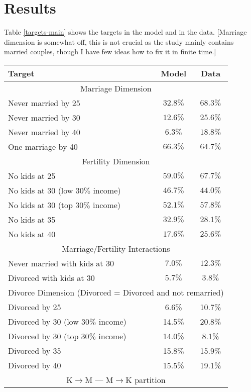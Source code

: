 \documentclass[12pt,letter]{article}
\begin{document}
\section{Results}
Table \ref{targets-main} shows the targets in the model and in the data. [Marriage dimension is somewhat off, this is not crucial as the study mainly contains married couples, though I have few ideas how to fix it in finite time.]
\begin{table}
\begin{center}
\begin{tabular}{|l|c|c|}\hline
Target & Model & Data \\\hline
\multicolumn{3}{|c|}{Marriage Dimension} \\\hline
Never married by 25  & $32.8\%$ & $68.3\%$  \\
Never married by 30 & $12.6\%$ & $25.6\%$  \\
Never married by 40 & $6.3\%$ & $18.8\%$  \\\hline
One marriage by 40 & $66.3\%$ & $64.7\%$ \\\hline
\multicolumn{3}{|c|}{Fertility Dimension} \\\hline
No kids at 25 & $59.0\%$ & $67.7\%$ \\
No kids at 30 (low $30\%$ income) & $46.7\%$  &   $44.0\%$ \\
No kids at 30 (top $30\%$ income) & $52.1\%$  &   $57.8\%$ \\
No kids at 35  & $32.9\%$  &   $28.1\%$ \\
No kids at 40 & $17.6\%$ & $25.6\%$ \\\hline
\multicolumn{3}{|c|}{Marriage/Fertility Interactions} \\\hline
Never married with kids at 30 & $7.0\%$  & $12.3\%$ \\
Divorced with kids at 30 & $5.7\%$ & $3.8\%$ \\\hline
\multicolumn{3}{|c|}{Divorce Dimension (Divorced = Divorced and not remarried)} \\\hline
Divorced by 25 & 6.6\%   &  10.7\% \\
Divorced by 30 (low $30\%$ income)  & 14.5\% &     20.8\% \\
Divorced by 30 (top $30\%$ income)  & 14.0\% &     8.1\% \\
Divorced by 35  & 15.8\% &    15.9\% \\
Divorced by 40  & 15.5\% &    19.1\% \\\hline
\multicolumn{3}{|c|}{K$\to$M --- M$\to$K partition} \\\hline

\end{tabular}
\end{center}
\end{table}
\end{document}
